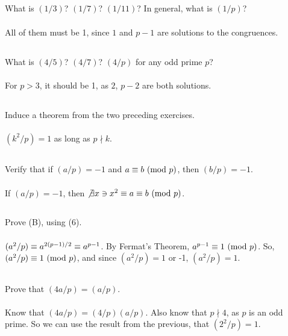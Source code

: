 \documentclass{article} \usepackage{amsmath}
\begin{document}
\subsection{}
What is $(1/3)$? $(1/7)$? $(1/11)$? In general, what is $(1/p)$?\\~\\
All of them must be 1, since $1$ and $p - 1$ are solutions to the congruences.

\subsection{}
What is $(4/5)$? $(4/7)$? $(4/p)$ for any odd prime $p$?\\~\\
For $p > 3$, it should be 1, as $2$, $p - 2$ are both solutions.

\subsection{}
Induce a theorem from the two preceding exercises.\\~\\
$(k^2/p) = 1$ as long as $p \nmid k$.

\subsection{}
Verify that if $(a/p) = -1$ and $a \equiv b \ (\mathrm{mod}\ p)$, then $(b/p) = -1$.\\~\\
If $(a/p) = -1$, then $\not\exists x \ni x^2 \equiv a \equiv b \ (\mathrm{mod}\ p)$.

\subsection{}
Prove (B), using (6).\\~\\
$(a^2/p) \equiv a^{2(p-1)/2} \equiv a^{p-1}$.
By Fermat's Theorem, $a^{p-1} \equiv 1 \ (\mathrm{mod}\ p)$.
So, $(a^2/p) \equiv 1 \ (\mathrm{mod}\ p)$, and since $(a^2/p) = 1$ or -1, $(a^2/p) = 1$.

\subsection{}
Prove that $(4a/p) = (a/p)$.\\~\\
Know that $(4a/p) = (4/p)(a/p)$.
Also know that $p \nmid 4$, as $p$ is an odd prime.
So we can use the result from the previous, that $(2^2/p) = 1$.
\end{document}
